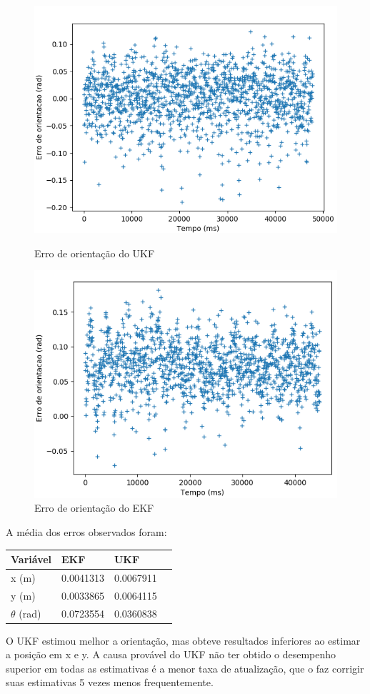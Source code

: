 \documentclass[
	12pt,				%
	openright,			%
	twoside,			%
	convert,
	a4paper,			%
	english,			%
	french,				%
	spanish,			%
	brazil				%
	]{abntex2}
\begin{document}
\begin{figure}[H]
  \centering
  \begin{minipage}[b]{0.45\textwidth}
    \includegraphics[width=\textwidth]{ukf_theta_comp}
    \caption{Erro de orientação do UKF}
  \end{minipage}
  \begin{minipage}[b]{0.45\textwidth}
    \includegraphics[width=\textwidth]{ekf_theta_comp}
    \caption{Erro de orientação do EKF}
  \end{minipage}
\end{figure}
A média dos erros observados foram:
\begin{center}
\begin{tabular}{ | l | l | l | p{5cm} |}
    \hline
    Variável & EKF & UKF \\ \hline
    x (m) & 0.0041313 & 0.0067911 \\ \hline
    y (m) & 0.0033865 & 0.0064115 \\ \hline
    $\theta$ (rad) & 0.0723554	& 0.0360838 \\
    \hline
\end{tabular}
\end{center}
O UKF estimou melhor a orientação, mas obteve resultados inferiores ao estimar a posição em x e y. A causa provável do UKF não ter obtido o desempenho superior em todas as estimativas é a menor taxa de atualização, que o faz corrigir suas estimativas 5 vezes menos frequentemente.
\end{document}
